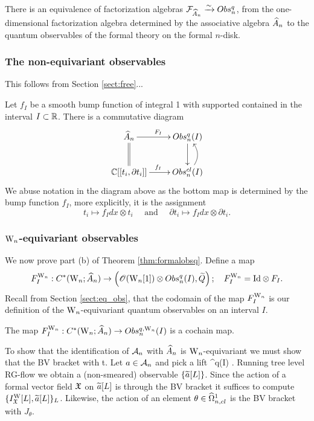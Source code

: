\begin{cor}
There is an equivalence of factorization algebras $\cF_{\hA_n} \xrightarrow{\sim} Obs^q_n$, from the one-dimensional factorization algebra determined by the associative algebra $\hA_n$ to the quantum observables of the formal theory on the formal $n$-disk.
\end{cor}


\subsubsection{The non-equivariant observables}

This follows from Section \ref{sect:free}...

Let $f_I$ be a smooth bump function of integral 1 with supported contained in the interval $I \subset \RR$.  There is a commutative diagram
\[
\xymatrix{
\hA_n \ar[r]^{F_I} \ar@{=}[d] & Obs^q_n (I) \ar[d]\\ \CC[[t_i , \partial t_i ]] \ar[r]^{f_I} & Obs^{cl}_n (I) \ar@/_1pc/[u]
}
\]
We abuse notation in the diagram above as the bottom map is determined by the bump function $f_I$, more explicitly, it is the assignment
\[
t_i \mapsto f_I dx \otimes t_i \quad \text{ and } \quad \partial t_i \mapsto f_I dx \otimes \partial t_i.
\]

\subsubsection{$\Vect$-equivariant observables}

We now prove part (b) of Theorem \ref{thm:formalobsq}.  Define a map
\[
F_I^\Vect : C^\ast (\Vect ; \hA_n) \to \left ( \sO (\Vect[1]) \otimes Obs^q_n (I) , \widetilde{Q} \right ); \quad F_I^\Vect = \mathrm{Id} \otimes F_I.
\]
Recall from Section \ref{sect:eq_obs}, that the codomain of the map $F^\Vect_I$ is our definition of the $\Vect$-equivariant quantum observables on an interval $I$.

\begin{prop}
The map $F_I^\Vect : C^\ast (\Vect ; \hA_n) \to Obs^{q, \Vect}_n (I)$ is a cochain map.
\end{prop}




To show that the identification of $\cA_n$ with $\hA_n$ is
$\Vect$-equivariant we must show that the BV bracket with t. Let $a \in \cA_n$ and pick
a lift 
\ben
{} \in \bObs^q(I) .
\een 
Running tree level RG-flow we obtain a (non-smeared) observable
$\{\Tilde{a}[L]\}$. Since the action of a formal vector field $\fX$ on
$\Tilde{a}[L]$ is through the BV bracket it suffices to compute
$\{I^{\rm W}_\fX [L] , \Tilde{a}[L]\}_L$. Likewise, the action of an element
$\theta \in \hOmega^1_{n,cl}$ is the BV bracket with $J_\theta$.

